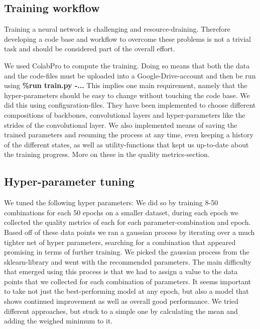 \subsection{Training workflow}

Training a neural network is challenging and resource-draining. Therefore developing a code base and workflow to overcome these problems is not a trivial task and should be considered part of the overall effort. 

We used ColabPro to compute the training. Doing so means that both the data and the code-files must be uploaded into a Google-Drive-account and then be run using
\newline \textbf{\%run train.py -...} 
\newline This implies one main requirement, namely that the hyper-parameters should be easy to change without touching the code base. We did this using configuration-files. They have been implemented to choose different compositions of backbones, convolutional layers and hyper-parameters like the strides of the convolutional layer. We also implemented means of saving the trained parameters and resuming the process at any time, even keeping a history of the different states, as well as utility-functions that kept us up-to-date about the training progress. More on these in the quality metrics-section. 

\subsection{Hyper-parameter tuning}
We tuned the following hyper parameters: 
We did so by training 8-50 combinations for each 50 epochs on a smaller dataset, during each epoch we collected the quality metrics of each for each parameter-combination and epoch. Based off of these data points we ran a gaussian process by iterating over a much tighter net of hyper parameters, searching for a combination that appeared promising in terms of further training. We picked the gaussian process from the sklearn-library and went with the recommended parameters.
The main difficulty that emerged using this process is that we had to assign a value to the data points that we collected for each combination of parameters. It seems important to take not just the best-performing model at any epoch, but also a model that shows continued improvement as well as overall good performance. We tried different approaches, but stuck to a simple one by calculating the mean and adding the weighed minimum to it. 

